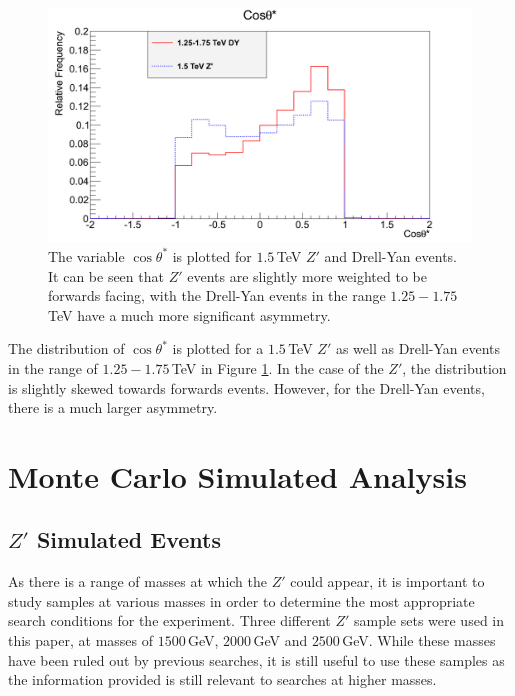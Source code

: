\documentclass{article}
\begin{document}
\begin{figure}[h]
    \centering \includegraphics[scale=0.3]{images/cosThetaStar.png} \caption{The variable $\cos\theta^*$ is plotted for $1.5\,$TeV $Z'$ and Drell-Yan events. It can be seen that $Z'$ events are slightly more weighted to be forwards facing, with the Drell-Yan events in the range $1.25-1.75\,$TeV have a much more significant asymmetry. \label{fig:cosTheta} }
\end{figure}

The distribution of $\cos\theta^*$ is plotted for a $1.5\,$TeV $Z'$ as well as Drell-Yan events in the range of $1.25-1.75\,$TeV in Figure \ref{fig:cosTheta}. In the case of the $Z'$, the distribution is slightly skewed towards forwards events. However, for the Drell-Yan events, there is a much larger asymmetry. 



\section{Monte Carlo Simulated Analysis}
\label{sec:MonteCarloSimulatedAnalysis}



\subsection{$Z'$ Simulated Events}
\label{sec:MCA_ZPrime} 
 
As there is a range of masses at which the $Z'$ could appear, it is important to study samples at various masses in order to determine the most appropriate search conditions for the experiment. Three different $Z'$ sample sets were used in this paper, at masses of $1500\,$GeV, $2000\,$GeV and $2500\,$GeV. While these masses have been ruled out by previous searches, it is still useful to use these samples as the information provided is still relevant to searches at higher masses. 
\end{document}
